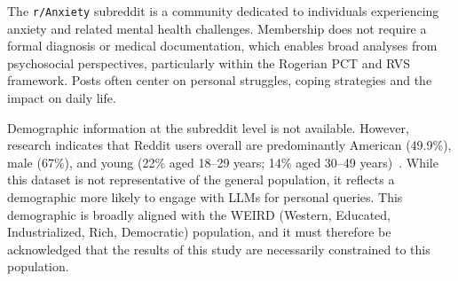 The \texttt{r/Anxiety} subreddit is a community dedicated to individuals experiencing anxiety and related mental health challenges. Membership does not require a formal diagnosis or medical documentation, which enables broad analyses from psychosocial perspectives, particularly within the Rogerian PCT and RVS framework. Posts often center on personal struggles, coping strategies and the impact on daily life.

Demographic information at the subreddit level is not available. However, research indicates that Reddit users overall are predominantly American (49.9\%), male (67\%), and young (22\% aged 18--29 years; 14\% aged 30--49 years)~\cite{pew-reddit-research,statista-reddit}. While this dataset is not representative of the general population, it reflects a demographic more likely to engage with LLMs for personal queries. This demographic is broadly aligned with the WEIRD (Western, Educated, Industrialized, Rich, Democratic) population, and it must therefore be acknowledged that the results of this study are necessarily constrained to this population.

